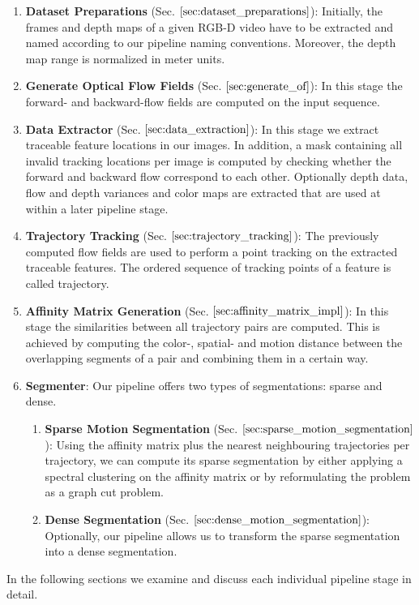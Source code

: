 \begin{enumerate}
\item \textbf{Dataset Preparations} (Sec. $\ref{sec:dataset_preparations}$): Initially, the frames and depth maps of a given RGB-D video have to be extracted and named according to our pipeline naming conventions. Moreover, the depth map range is normalized in meter units.
\item \textbf{Generate Optical Flow Fields} (Sec. $\ref{sec:generate_of}$): In this stage the forward- and backward-flow fields are computed on the input sequence.
\item \textbf{Data Extractor} (Sec. $\ref{sec:data_extraction}$): In this stage we extract traceable feature locations in our images. In addition, a mask containing all invalid tracking locations per image is computed by checking whether the forward and backward flow correspond to each other. Optionally depth data, flow and depth variances and color maps are extracted that are used at within a later pipeline stage. 
\item \textbf{Trajectory Tracking} (Sec. $\ref{sec:trajectory_tracking}$): The previously computed flow fields are used to perform a point tracking on the extracted traceable features. The ordered sequence of tracking points of a feature is called trajectory.
\item \textbf{Affinity Matrix Generation} (Sec. $\ref{sec:affinity_matrix_impl}$): In this stage the similarities between all trajectory pairs are computed. This is achieved by computing the color-, spatial- and motion distance between the overlapping segments of a pair and combining them in a certain way.
\item \textbf{Segmenter}: Our pipeline offers two types of segmentations: sparse and dense. 
	\begin{enumerate}
	\item \textbf{Sparse Motion Segmentation} (Sec. $\ref{sec:sparse_motion_segmentation}$): Using the affinity matrix plus the nearest neighbouring trajectories per trajectory, we can compute its sparse segmentation by either applying a spectral clustering on the affinity matrix or by reformulating the problem as a graph cut problem. 
	\item \textbf{Dense Segmentation} (Sec. $\ref{sec:dense_motion_segmentation}$): Optionally, our pipeline allows us to transform the sparse segmentation into a dense segmentation. 	
	\end{enumerate}
\end{enumerate}
In the following sections we examine and discuss each individual pipeline stage in detail. 

